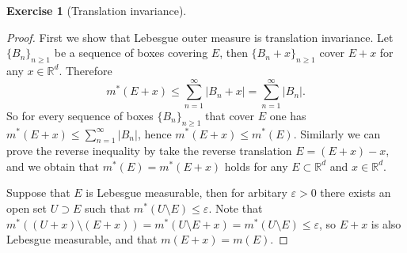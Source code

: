 \documentclass[a4paper]{article}
\newtheorem{ex}{Exercise}[subsection]
\begin{document}
\begin{ex}[Translation invariance]\end{ex}
\begin{proof}
First we show that Lebesgue outer measure is translation invariance. Let $\{B_n\}_{n \geq 1}$ be a sequence of boxes
covering $E$, then $\{B_n + x\}_{n \geq 1}$ cover $E + x$ for any $x \in \mathbb{R}^d$. Therefore $$
m^*(E + x) \leq \sum_{n = 1}^\infty |B_n + x| = \sum_{n = 1}^\infty |B_n|.
$$
So for every sequence of boxes $\{B_n\}_{n \geq 1}$ that cover $E$ one has $m^*(E + x) \leq \sum_{n = 1}^\infty |B_n|$,
hence $m^*(E + x) \leq m^*(E)$. Similarly we can prove the reverse inequality by take the reverse translation 
$E = (E + x) - x$, and we obtain that $m^*(E) = m^*(E + x)$  holds for any $E \subset \mathbb{R}^d$ and $x \in \mathbb{R}^d$.

Suppose that $E$ is Lebesgue measurable, then for arbitary $\varepsilon > 0$ there exists an open set $U \supset E$ 
such that $m^*(U \setminus E) \leq \varepsilon$. Note that 
$m^*((U + x) \setminus (E + x)) = m^*(U \setminus E + x) = m^*(U \setminus E) \leq \varepsilon$, so $E + x$ is 
also Lebesgue measurable, and that $m(E + x) = m(E)$.
\end{proof}
\end{document}
